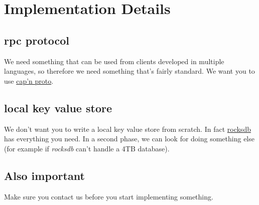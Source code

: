 \documentclass{article}
\begin{document}
\section{Implementation Details}

\subsection{rpc protocol}
We need something that can be used from clients developed in multiple languages,
so therefore we need something that's fairly standard.
We want you to use \href{http://kentonv.github.io/capnproto/}{cap'n proto}.
\subsection{local key value store}
We don't want you to write a local key value store from scratch.
In fact \href{http://rocksdb.org/}{rocksdb} has everything you need.
In a second phase, we can look for doing something else (for example if \emph{rocksdb} can't handle a 4TB database).

\subsection{Also important}
Make sure you contact us before you start implementing something.
\end{document}
